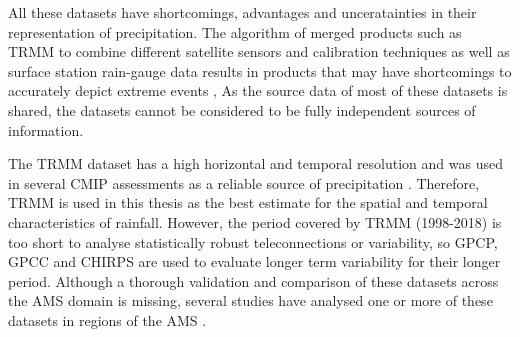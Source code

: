 All these datasets have shortcomings, advantages and unceratainties in their representation of precipitation. The algorithm of merged products such as TRMM to combine different satellite sensors and calibration techniques as well as surface station rain-gauge data results in products that may have shortcomings to accurately depict extreme events \citep{trejo2016}, 
As the source data of most of these datasets is shared, the datasets cannot be considered to be fully independent sources of information. 



The TRMM dataset has a high horizontal and temporal resolution and was used in several CMIP assessments \citep{geil2013,jones2013} as a reliable source of precipitation \citep{carvalho2012}. Therefore, TRMM is used in this thesis as the best estimate for the spatial and temporal characteristics of rainfall. However,
 the period covered by TRMM (1998-2018) is too short to analyse statistically robust teleconnections or variability, so GPCP, GPCC and CHIRPS are used to evaluate longer term variability for their longer period. 
 Although a thorough validation and comparison of these datasets across the AMS domain is missing, several studies have analysed  one or more of these datasets in regions of the AMS \citep[e.g.][]{franchito2009,dinku2010,trejo2016}.

